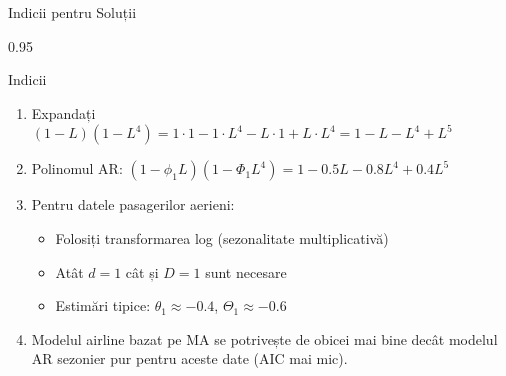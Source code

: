 \documentclass[9pt, aspectratio=169, t]{beamer}
\begin{document}
\begin{frame}{Indicii pentru Soluții}
    \begin{cminipage}{0.95\textwidth}
    {\small
    \begin{block}{Indicii}
        \begin{enumerate}\setlength{\itemsep}{0pt}
            \item Expandați $(1-L)(1-L^4) = 1 \cdot 1 - 1 \cdot L^4 - L \cdot 1 + L \cdot L^4 = 1 - L - L^4 + L^5$

            \vspace{0.1cm}
            \item Polinomul AR: $(1 - \phi_1 L)(1 - \Phi_1 L^4) = 1 - 0.5L - 0.8L^4 + 0.4L^5$

            \vspace{0.1cm}
            \item Pentru datele pasagerilor aerieni:
                \begin{itemize}\setlength{\itemsep}{0pt}
                    \item Folosiți transformarea log (sezonalitate multiplicativă)
                    \item Atât $d=1$ cât și $D=1$ sunt necesare
                    \item Estimări tipice: $\theta_1 \approx -0.4$, $\Theta_1 \approx -0.6$
                \end{itemize}

            \vspace{0.1cm}
            \item Modelul airline bazat pe MA se potrivește de obicei mai bine decât modelul AR sezonier pur pentru aceste date (AIC mai mic).
        \end{enumerate}
    \end{block}
    }
    \end{cminipage}
\end{frame}
\end{document}
